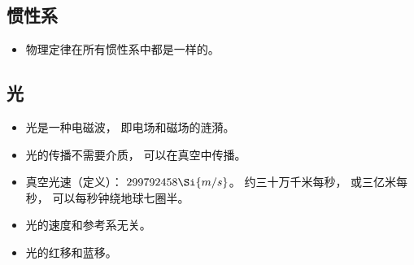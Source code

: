 
\begin{issues}
\issueDraft
\end{issues}


\subsection{惯性系}
\begin{itemize}
\item 物理定律在所有惯性系中都是一样的。
\end{itemize}

\subsection{光}
\begin{itemize}
\item 光是一种电磁波， 即电场和磁场的涟漪。
\item 光的传播不需要介质， 可以在真空中传播。
\item 真空光速（定义）： $299792458\Si{m/s}$。 约三十万千米每秒， 或三亿米每秒， 可以每秒钟绕地球七圈半。
\item 光的速度和参考系无关。
\item 光的红移和蓝移。
\end{itemize}
